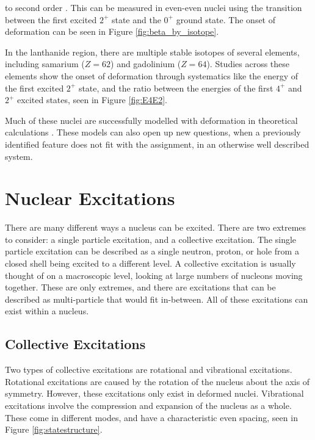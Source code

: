 to second order \citep{casten90:_structure}. This can be measured in even-even nuclei using the transition between the first excited $2^+$ state and the $0^+$ ground state. The onset of deformation can be seen in Figure \ref{fig:beta_by_isotope}.



In the lanthanide region, there are multiple stable isotopes of several elements, including samarium ($Z=62$) and gadolinium ($Z=64$). Studies across these elements show the onset of deformation through systematics like the energy of the first excited $2^+$ state, and the ratio between the energies of the first $4^+$ and $2^+$ excited states, seen in Figure \ref{fig:E4E2}.



Much of these nuclei are successfully modelled with deformation in theoretical calculations \citep{delaroche10:_systematics}. These models can also open up new questions, when a previously identified feature does not fit with the assignment, in an otherwise well described system.

\section{Nuclear Excitations}

There are many different ways a nucleus can be excited. There are two extremes to consider: a single particle excitation, and a collective excitation. The single particle excitation can be described as a single neutron, proton, or hole from a closed shell being excited to a different level. A collective excitation is usually thought of on a macroscopic level, looking at large numbers of nucleons moving together. These are only extremes, and there are excitations that can be described as multi-particle that would fit in-between. All of these excitations can exist within a nucleus.

\subsection{Collective Excitations}

Two types of collective excitations are rotational and vibrational excitations. Rotational excitations are caused by the rotation of the nucleus about the axis of symmetry. However, these excitations only exist in deformed nuclei. Vibrational excitations involve the compression and expansion of the nucleus as a whole. These come in different modes, and have a characteristic even spacing, seen in Figure \ref{fig:statestructure}.

